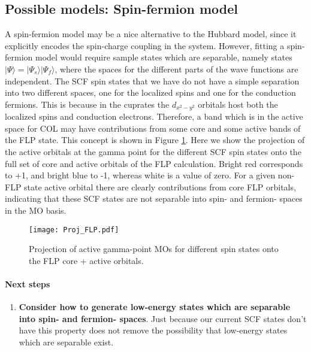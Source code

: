 \documentclass{article}
\begin{document}
\subsection{Possible models: Spin-fermion model}
A spin-fermion model may be a nice alternative to the Hubbard model, since it explicitly encodes the spin-charge coupling in the system. However, fitting a spin-fermion model would require sample states which are separable, namely states $|\Psi\rangle = |\Psi_s\rangle |\Psi_f\rangle$, where the spaces for the different parts of the wave functions are independent. The SCF spin states that we have do not have a simple separation into two different spaces, one for the localized spins and one for the conduction fermions. This is because in the cuprates the $d_{x^2-y^2}$ orbitals host both the localized spins and conduction electrons. Therefore, a band which is in the active space for COL may have contributions from some core and some active bands of the FLP state. This concept is shown in Figure \ref{fig:Proj_FLP}. Here we show the projection of the active orbitals at the gamma point for the different SCF spin states onto the full set of core and active orbitals of the FLP calculation. Bright red corresponds to +1, and bright blue to -1, whereas white is a value of zero. For a given non-FLP state active orbital there are clearly contributions from core FLP orbitals, indicating that these SCF states are not separable into spin- and fermion- spaces in the MO basis. 

\begin{figure}[H]
\centering
\texttt{[image: Proj\_FLP.pdf]}
\caption{Projection of active gamma-point MOs for different spin states onto the FLP core + active orbitals.}
\label{fig:Proj_FLP}
\end{figure}
\pagebreak
\paragraph{Next steps}
\begin{enumerate}
\item \textbf{Consider how to generate low-energy states which are separable into spin- and fermion- spaces}. Just because our current SCF states don't have this property does not remove the possibility that low-energy states which are separable exist.
\end{enumerate}
\end{document}
